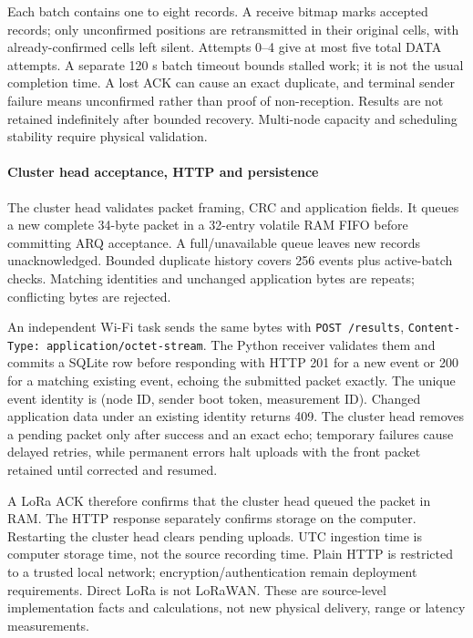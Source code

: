 Each batch contains one to eight records. A receive bitmap marks accepted records; only unconfirmed positions are retransmitted in their original cells, with already-confirmed cells left silent. Attempts 0--4 give at most five total DATA attempts. A separate 120 s batch timeout bounds stalled work; it is not the usual completion time. A lost ACK can cause an exact duplicate, and terminal sender failure means unconfirmed rather than proof of non-reception. Results are not retained indefinitely after bounded recovery. Multi-node capacity and scheduling stability require physical validation.

\paragraph{Cluster head acceptance, HTTP and persistence}
The cluster head validates packet framing, CRC and application fields. It queues a new complete 34-byte packet in a 32-entry volatile RAM FIFO before committing ARQ acceptance. A full/unavailable queue leaves new records unacknowledged. Bounded duplicate history covers 256 events plus active-batch checks. Matching identities and unchanged application bytes are repeats; conflicting bytes are rejected.

An independent Wi-Fi task sends the same bytes with \texttt{POST /results}, \texttt{Content-Type: application/octet-stream}. The Python receiver validates them and commits a SQLite row before responding with HTTP 201 for a new event or 200 for a matching existing event, echoing the submitted packet exactly. The unique event identity is (node ID, sender boot token, measurement ID). Changed application data under an existing identity returns 409. The cluster head removes a pending packet only after success and an exact echo; temporary failures cause delayed retries, while permanent errors halt uploads with the front packet retained until corrected and resumed.

A LoRa ACK therefore confirms that the cluster head queued the packet in RAM. The HTTP response separately confirms storage on the computer. Restarting the cluster head clears pending uploads. UTC ingestion time is computer storage time, not the source recording time. Plain HTTP is restricted to a trusted local network; encryption/authentication remain deployment requirements. Direct LoRa is not LoRaWAN. These are source-level implementation facts and calculations, not new physical delivery, range or latency measurements.
\endgroup
\FloatBarrier
